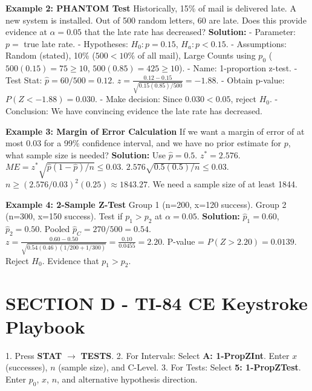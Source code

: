 \textbf{Example 2: PHANTOM Test}
Historically, 15\% of mail is delivered late. A new system is installed. Out of 500 random letters, 60 are late. Does this provide evidence at $\alpha=0.05$ that the late rate has decreased?
\textbf{Solution:}
- Parameter: $p = $ true late rate.
- Hypotheses: $H_0: p = 0.15$, $H_a: p < 0.15$.
- Assumptions: Random (stated), 10\% ($500 < 10\%$ of all mail), Large Counts using $p_0$ ($500(0.15)=75 \geq 10$, $500(0.85)=425 \geq 10$).
- Name: 1-proportion z-test.
- Test Stat: $\hat{p} = 60/500 = 0.12$. $z = \frac{0.12 - 0.15}{\sqrt{0.15(0.85)/500}} = -1.88$.
- Obtain p-value: $P(Z < -1.88) = 0.030$.
- Make decision: Since $0.030 < 0.05$, reject $H_0$.
- Conclusion: We have convincing evidence the late rate has decreased.

\textbf{Example 3: Margin of Error Calculation}
If we want a margin of error of at most 0.03 for a 99\% confidence interval, and we have no prior estimate for $p$, what sample size is needed?
\textbf{Solution:}
Use $\hat{p} = 0.5$. $z^* = 2.576$. $ME = z^* \sqrt{\hat{p}(1-\hat{p})/n} \leq 0.03$.
$2.576 \sqrt{0.5(0.5)/n} \leq 0.03$.
$n \geq (2.576/0.03)^2 (0.25) \approx 1843.27$.
We need a sample size of at least 1844.

\textbf{Example 4: 2-Sample Z-Test}
Group 1 (n=200, x=120 success). Group 2 (n=300, x=150 success). Test if $p_1 > p_2$ at $\alpha=0.05$.
\textbf{Solution:}
$\hat{p}_1 = 0.60$, $\hat{p}_2 = 0.50$. Pooled $\hat{p}_C = 270/500 = 0.54$.
$z = \frac{0.60 - 0.50}{\sqrt{0.54(0.46)(1/200 + 1/300)}} = \frac{0.10}{0.0455} = 2.20$.
P-value = $P(Z > 2.20) = 0.0139$. Reject $H_0$. Evidence that $p_1 > p_2$.

\section{SECTION D - TI-84 CE Keystroke Playbook}
\begin{calculatorbox}
1. Press \textbf{STAT} $\rightarrow$ \textbf{TESTS}.
2. For Intervals: Select \textbf{A: 1-PropZInt}. Enter $x$ (successes), $n$ (sample size), and C-Level.
3. For Tests: Select \textbf{5: 1-PropZTest}. Enter $p_0$, $x$, $n$, and alternative hypothesis direction.
\end{calculatorbox}

